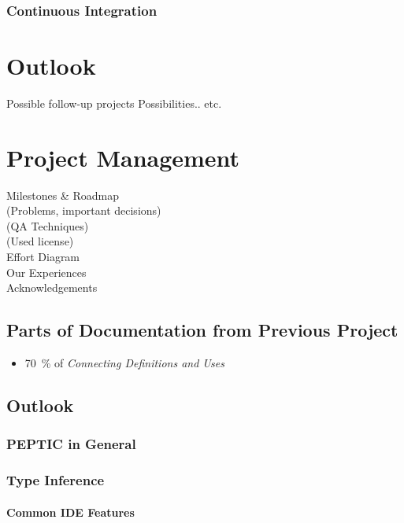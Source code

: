 \documentclass[12pt,halfparskip,DIV11,BCOR10mm]{scrreprt}
\begin{document}

\subsection{Continuous Integration}



\chapter{Outlook}
 Possible follow-up projects
 Possibilities.. etc.

\chapter{Project Management}
 Milestones \& Roadmap \\
 (Problems, important decisions) \\
 (QA Techniques) \\
 (Used license) \\
 Effort Diagram \\
 Our Experiences \\
 Acknowledgements 



\section{Parts of Documentation from Previous Project}

\begin{itemize}
    \item 70~\% of \emph{Connecting Definitions and Uses} %
\end{itemize}

\section{Outlook}
\subsection{PEPTIC in General}
\subsection{Type Inference}
\subsubsection{Common IDE Features}
\end{document}
